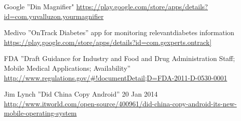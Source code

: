 \documentclass[conference]{IEEEtran}
\begin{document}
\begin{thebibliography}{1}
Google ''Din Magnifier" \url{https://play.google.com/store/apps/details?id=com.yuvalluzon.yourmagnifier}

Medivo ''OnTrack Diabetes'' app for monitoring relevantdiabetes information
\url{https://play.google.com/store/apps/details?id=com.gexperts.ontrack]}

FDA ''Draft Guidance for Industry and Food and Drug Administration Staff; Mobile Medical Applications; Availability''
\url{http://www.regulations.gov/#!documentDetail;D=FDA-2011-D-0530-0001}





Jim Lynch ''Did China Copy Android''  20 Jan 2014 \url{http://www.itworld.com/open-source/400961/did-china-copy-android-its-new-mobile-operating-system} 

\end{thebibliography}
\end{document}
